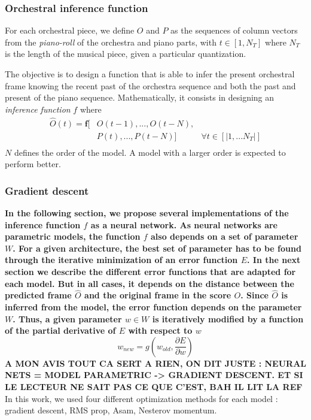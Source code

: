 \documentclass{article}
\begin{document}
\subsubsection{Orchestral inference function}
For each orchestral piece, we define $O$ and $P$ as the sequences of column vectors from the \textit{piano-roll} of the orchestra and piano parts, with $t \in \left[ 1,N_{T} \right]$ where $N_{T}$ is the length of the musical piece, given a particular quantization.

The objective is to design a function that is able to infer the present orchestral frame knowing the recent past of the orchestra sequence and both the past and present of the piano sequence. Mathematically, it consists in designing an \textit{inference function} $f$ where
\begin{equation}
\begin{aligned}
\hat{O}(t) = \bm{f}\lbrack & O(t-1), ..., O(t-N), & \\
	& P(t), ... ,P(t-N) \rbrack & \forall t \in \left\lbrack|1, ... N_{T}|\right\rbrack\\
\end{aligned}
\label{eq:inference_function}
\end{equation}
$N$ defines the order of the model. A model with a larger order is expected to perform better.

\subsubsection{Gradient descent}
\textbf{In the following section, we propose several implementations of the inference function $f$ as a neural network.
As neural networks are parametric models, the function $f$ also depends on a set of parameter $W$. For a given architecture, the best set of parameter has to be found through the iterative minimization of an error function $E$.
In the next section we describe the different error functions that are adapted for each model.
But in all cases, it depends on the distance between the predicted frame $\hat{O}$ and the original frame in the score $O$. Since $\hat{O}$ is inferred from the model, the error function depends on the parameter $W$.
Thus, a given parameter $w \in W$ is iteratively modified by a function of the partial derivative of $E$ with respect to $w$
\[
w_{new} = g(w_{old}, \frac{\partial E}{\partial w})
\]
} \textbf{A MON AVIS TOUT CA SERT A RIEN, ON DIT JUSTE : NEURAL NETS = MODEL PARAMETRIC -> GRADIENT DESCENT. ET SI LE LECTEUR NE SAIT PAS CE QUE C'EST, BAH IL LIT LA REF}
In this work, we used four different optimization methods for each model : gradient descent, RMS prop, Asam, Nesterov momentum.
\end{document}
